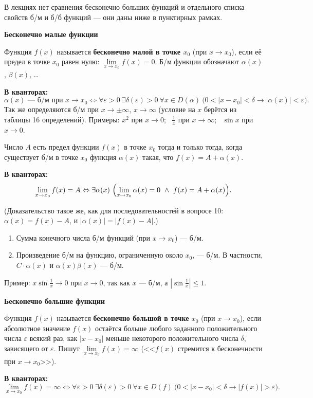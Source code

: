 \documentclass[a4paper,11pt]{article}
\newcommand{\eps}{\varepsilon}
\newcommand{\kv}{\par\noindent\textbf{\textcolor{oprc!85!black}{В кванторах:}}}
\newcommand{\podr}[1]{\par\needspace{8\baselineskip}\medskip
  {\large\bfseries\textcolor{oprc!80!black}{#1}}\par\nopagebreak\smallskip}
\begin{document}
{\small\textcolor{zamc}{В лекциях нет сравнения бесконечно больших функций и отдельного списка свойств б/м и б/б функций ---
они даны ниже в пунктирных рамках.}}

\podr{Бесконечно малые функции}

\begin{opr}
Функция $f(x)$ называется \textbf{бесконечно малой в точке $x_0$} (при $x \to x_0$), если её предел в точке $x_0$ равен нулю:
$\lim\limits_{x \to x_0} f(x) = 0$. Б/м функции обозначают $\alpha(x)$, $\beta(x)$, \dots
\kv
\[
  \alpha(x) \text{ --- б/м при } x \to x_0 \Leftrightarrow
  \forall \eps > 0\ \exists \delta(\eps) > 0\ \forall x \in D(\alpha)\ \bigl( 0 < |x - x_0| < \delta \to |\alpha(x)| < \eps \bigr).
\]
Так же определяются б/м при $x \to \pm\infty$, $x \to \infty$ (условие на $x$ берётся из таблицы 16 определений).
Примеры: $x^2$ при $x \to 0$; \ $\frac1x$ при $x \to \infty$; \ $\sin x$ при $x \to 0$.
\end{opr}

\begin{teo}
Число $A$ есть предел функции $f(x)$ в точке $x_0$ тогда и только тогда, когда существует б/м в точке $x_0$ функция $\alpha(x)$ такая,
что $f(x) = A + \alpha(x)$.
\kv
\[
  \lim_{x \to x_0} f(x) = A \Leftrightarrow \exists \alpha(x)\ \Bigl(\lim_{x \to x_0} \alpha(x) = 0 \ \wedge\ f(x) = A + \alpha(x)\Bigr).
\]
\end{teo}
(Доказательство такое же, как для последовательностей в вопросе 10: $\alpha(x) = f(x) - A$, и $|\alpha(x)| = |f(x) - A|$.)

\begin{dop}
\begin{enumerate}
  \item Сумма конечного числа б/м функций (при $x \to x_0$) --- б/м.
  \item Произведение б/м на функцию, ограниченную около $x_0$, --- б/м. В частности, $C \cdot \alpha(x)$ и $\alpha(x)\beta(x)$ --- б/м.
\end{enumerate}
Пример: $x \sin\frac1x \to 0$ при $x \to 0$, так как $x$ --- б/м, а $\left|\sin\frac1x\right| \le 1$.
\end{dop}

\podr{Бесконечно большие функции}

\begin{opr}
Функция $f(x)$ называется \textbf{бесконечно большой в точке $x_0$} (при $x \to x_0$), если абсолютное значение $f(x)$ остаётся
больше любого заданного положительного числа $\eps$ всякий раз, как $|x - x_0|$ меньше некоторого положительного числа $\delta$,
зависящего от $\eps$. Пишут $\lim\limits_{x \to x_0} f(x) = \infty$ (<<$f(x)$ стремится к бесконечности при $x \to x_0$>>).
\kv
\[
  \lim_{x \to x_0} f(x) = \infty \Leftrightarrow
  \forall \eps > 0\ \exists \delta(\eps) > 0\ \forall x \in D(f)\ \bigl( 0 < |x - x_0| < \delta \to |f(x)| > \eps \bigr).
\]
\end{opr}
\end{document}

